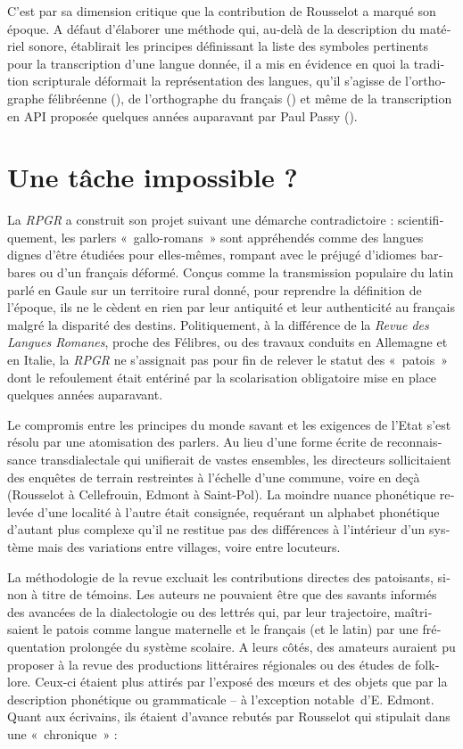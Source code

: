 \documentclass[french,output=paper,colorlinks,citecolor=brown]{../langscibook}
\begin{document}
\begin{otherlanguage}{french}
C’est par sa dimension critique que la contribution de Rousselot a marqué son époque. A défaut d’élaborer une méthode qui, au-delà de la description du matériel sonore, établirait les principes définissant la liste des symboles pertinents pour la transcription d’une langue donnée, il a mis en évidence en quoi la tradition scripturale déformait la représentation des langues, qu’il s’agisse de l’orthographe félibréenne (\citealt[II-158]{Rousselot1887}), de l’orthographe du français (\citealt[III-239]{Rousselot1887}) et même de la transcription en API proposée quelques années auparavant par Paul Passy (\citealt[III-238]{Rousselot1887}).

\section{Une tâche impossible ?}
\largerpage
La \textit{RPGR} a construit son projet suivant une démarche contradictoire : scientifiquement, les parlers «~gallo-romans~» sont appréhendés comme des langues dignes d’être étudiées pour elles-mêmes, rompant avec le préjugé d’idiomes barbares ou d’un français déformé. Conçus comme la transmission populaire du latin parlé en Gaule sur un territoire rural donné, pour reprendre la définition de l’époque, ils ne le cèdent en rien par leur antiquité et leur authenticité au français malgré la disparité des destins. Politiquement, à la différence de la \textit{Revue des Langues Romanes}, proche des Félibres, ou des travaux conduits en Allemagne et en Italie, la \textit{RPGR} ne s’assignait pas pour fin de relever le statut des «~patois~» dont le refoulement était entériné par la scolarisation obligatoire mise en place quelques années auparavant. 

Le compromis entre les principes du monde savant et les exigences de l’Etat s’est résolu par une atomisation des parlers. Au lieu d’une forme écrite de reconnaissance transdialectale qui unifierait de vastes ensembles, les directeurs sollicitaient des enquêtes de terrain restreintes à l’échelle d’une commune, voire en deçà (Rousselot à Cellefrouin, Edmont à Saint-Pol). La moindre nuance phonétique relevée d’une localité à l’autre était consignée, requérant un alphabet phonétique d’autant plus complexe qu’il ne restitue pas des différences à l’intérieur d’un système mais des variations entre villages, voire entre locuteurs.

La méthodologie de la revue excluait les contributions directes des patoisants, sinon à titre de témoins. Les auteurs ne pouvaient être que des savants informés des avancées de la dialectologie ou des lettrés qui, par leur trajectoire, maîtrisaient le patois comme langue maternelle et le français (et le latin) par une fréquentation prolongée du système scolaire. A leurs côtés, des amateurs auraient pu proposer à la revue des productions littéraires régionales ou des études de folklore. Ceux-ci étaient plus attirés par l’exposé des mœurs et des objets que par la description phonétique ou grammaticale – à l’exception notable~d’E. Edmont. Quant aux écrivains, ils étaient d’avance rebutés par Rousselot qui stipulait dans une «~chronique~» :


\end{otherlanguage}
\end{document}

